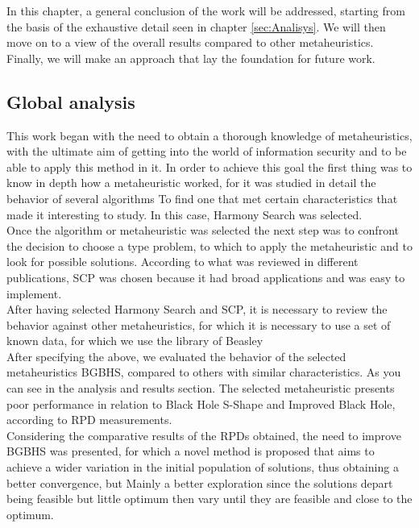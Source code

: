 In this chapter, a general conclusion of the work will be addressed, starting from the basis of the exhaustive detail seen in chapter \ref{sec:Analisys}.
We will then move on to a view of the overall results compared to other metaheuristics. Finally, we will make an approach that lay the foundation for future work.

\subsection{Global analysis}
This work began with the need to obtain a thorough knowledge of metaheuristics, with the ultimate aim of getting into the world of information security and to be able to apply this method in it. In order to achieve this goal the first thing was to know in depth how a metaheuristic worked, for it was studied in detail the behavior of several algorithms
To find one that met certain characteristics that made it interesting to study. In this case, Harmony Search was selected.\\

Once the algorithm or metaheuristic was selected the next step was to confront the decision to choose a type problem, to which to apply the metaheuristic and to look for possible solutions. According to what was reviewed in different publications, SCP was chosen because it had broad applications and was easy to implement.\\

After having selected Harmony Search and SCP, it is necessary to review the behavior against other metaheuristics, for which it is necessary to use a set of known data, for which we use the library of Beasley\\

After specifying the above, we evaluated the behavior of the selected metaheuristics BGBHS, compared to others with similar characteristics. As you can see in the analysis and results section. The selected metaheuristic presents poor performance in relation to Black Hole S-Shape and Improved Black Hole, according to RPD measurements.\\

Considering the comparative results of the RPDs obtained, the need to improve BGBHS was presented, for which a novel method is proposed that aims to achieve a wider variation in the initial population of solutions, thus obtaining a better convergence, but Mainly a better exploration since the solutions depart being feasible but little optimum then vary until they are feasible and close to the optimum.\\